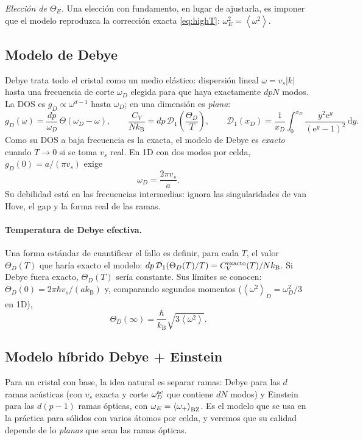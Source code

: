 \documentclass[11pt,a4paper]{article}
\newcommand{\kB}{k_{\mathrm B}}
\newcommand{\dd}{\mathrm{d}}
\newcommand{\ee}{\mathrm{e}}
\newcommand{\avg}[1]{\left\langle #1\right\rangle}
\newcommand{\vs}{v_{s}}
\begin{document}
\emph{Elección de $\Theta_E$.} Una elección con fundamento, en lugar de
ajustarla, es imponer que el modelo reproduzca la corrección exacta
\eqref{eq:highT}: $\omega_E^2=\avg{\omega^2}$.

\subsection{Modelo de Debye}

Debye trata todo el cristal como un medio elástico: dispersión lineal
$\omega=\vs|k|$ hasta una frecuencia de corte $\omega_D$ elegida para que haya
exactamente $dpN$ modos. La DOS es $g_D\propto\omega^{d-1}$ hasta $\omega_D$;
en una dimensión es \emph{plana}:
\begin{equation}
g_D(\omega)=\frac{dp}{\omega_D}\,\Theta(\omega_D-\omega),\qquad
\frac{C_V}{N\kB}=dp\,\mathcal D_1\!\left(\frac{\Theta_D}{T}\right),\qquad
\mathcal D_1(x_D)=\frac{1}{x_D}\int_0^{x_D}\frac{y^2\ee^y}{(\ee^y-1)^2}\,\dd y .
\end{equation}
Como su DOS a baja frecuencia es la exacta, el modelo de Debye es \emph{exacto}
cuando $T\to0$ si se toma $\vs$ real. En 1D con dos modos por celda,
$g_D(0)=a/(\pi\vs)$ exige
\begin{equation}
\omega_D=\frac{2\pi\vs}{a}.
\end{equation}
Su debilidad está en las frecuencias intermedias: ignora las singularidades de
van Hove, el gap y la forma real de las ramas.

\paragraph{Temperatura de Debye efectiva.} Una forma estándar de cuantificar el
fallo es definir, para cada $T$, el valor $\Theta_D(T)$ que haría exacto el
modelo: $dp\,\mathcal D_1(\Theta_D(T)/T)=C_V^{\rm exacto}(T)/N\kB$. Si Debye
fuera exacto, $\Theta_D(T)$ sería constante. Sus límites se conocen:
$\Theta_D(0)=2\pi\hbar\vs/(a\kB)$ y, comparando segundos momentos
($\avg{\omega^2}_D=\omega_D^2/3$ en 1D),
\begin{equation}
\Theta_D(\infty)=\frac{\hbar}{\kB}\sqrt{3\avg{\omega^2}} .
\end{equation}

\subsection{Modelo híbrido Debye + Einstein}

Para un cristal con base, la idea natural es separar ramas: Debye para las $d$
ramas acústicas (con $\vs$ exacta y corte $\omega_D^{\rm ac}$ que contiene
$dN$ modos) y Einstein para las $d(p-1)$ ramas ópticas, con
$\omega_E=\avg{\omega_+}_{\rm BZ}$. Es el modelo que se usa en la práctica para
sólidos con varios átomos por celda, y veremos que su calidad depende de lo
\emph{planas} que sean las ramas ópticas.
\end{document}
